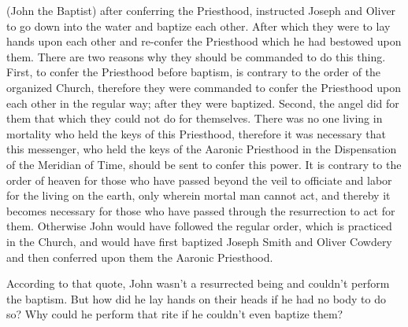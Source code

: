 \begin{displayquote}
(John the Baptist) after conferring the Priesthood, instructed Joseph and Oliver to 
go down into the water and baptize each other. After which they were to lay hands 
upon each other and re-confer the Priesthood which he had bestowed upon them. There 
are two reasons why they should be commanded to do this thing. First, to confer the 
Priesthood before baptism, is contrary to the order of the organized Church, 
therefore they were commanded to confer the Priesthood upon each other in the regular 
way; after they were baptized. Second, the angel did for them that which they could 
not do for themselves. There was no one living in mortality who held the keys of this 
Priesthood, therefore it was necessary that this messenger, who held the keys of the 
Aaronic Priesthood in the Dispensation of the Meridian of Time, should be sent to 
confer this power. It is contrary to the order of heaven for those who have passed 
beyond the veil to officiate and labor for the living on the earth, only wherein 
mortal man cannot act, and thereby it becomes necessary for those who have passed 
through the resurrection to act for them. Otherwise John would have followed the 
regular order, which is practiced in the Church, and would have first baptized 
Joseph Smith and Oliver Cowdery and then conferred upon them the Aaronic 
Priesthood.\cite{essentials}
\end{displayquote}

According to that quote, John wasn't a resurrected being and couldn't perform the
baptism. But how did he lay hands on their heads if he had no body to do so? Why
could he perform that rite if he couldn't even baptize them?